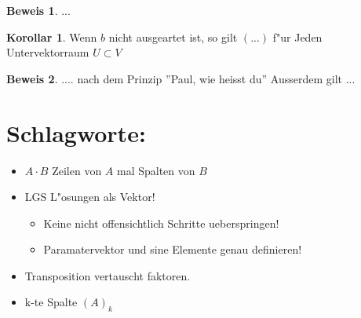 \documentclass[fontsize=11pt,paper=a4,BCOR=0mm,DIV=11,automark,headsepline]{scrbook}
\theoremstyle{remark}
\theoremstyle{definition}
\newtheorem*{korollar}{Korollar}
\theoremstyle{proof}
\newtheorem*{prof}{Beweis}
\theoremstyle{remark}
\begin{document}
\begin{prof}
  ... 
\end{prof}

\begin{korollar}
  Wenn $b$ nicht ausgeartet ist, so gilt $(...)$ f"ur Jeden Untervektorraum
  $U\subset  V$
\end{korollar}
\begin{prof}
  .... nach dem Prinzip ''Paul, wie heisst du'' Ausserdem gilt ...
\end{prof}

\section{Schlagworte:}
\label{sec:orgcf8c685}
\begin{itemize}
\item \(A\cdot B\) Zeilen von \(A\) mal Spalten von \(B\)
\item LGS L"osungen als Vektor!
\begin{itemize}
\item Keine nicht offensichtlich Schritte ueberspringen!
\item Paramatervektor und sine Elemente genau definieren!
\end{itemize}
\item Transposition vertauscht faktoren.
\item k-te Spalte \((A)_k\)
\end{itemize}
\end{document}
